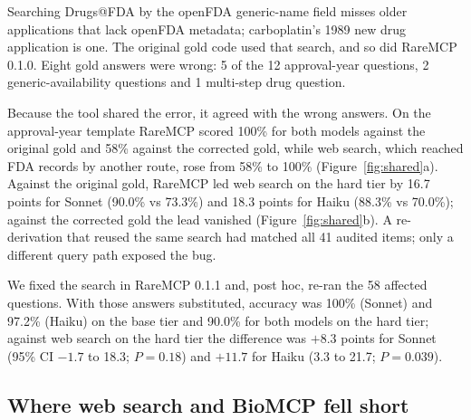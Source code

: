 \documentclass[11pt]{article}
\begin{document}
Searching Drugs@FDA by the openFDA generic-name field misses older applications that lack openFDA metadata; carboplatin's 1989 new drug application is one. The original gold code used that search, and so did RareMCP 0.1.0. Eight gold answers were wrong: 5 of the 12 approval-year questions, 2 generic-availability questions and 1 multi-step drug question.

Because the tool shared the error, it agreed with the wrong answers. On the approval-year template RareMCP scored 100\% for both models against the original gold and 58\% against the corrected gold, while web search, which reached FDA records by another route, rose from 58\% to 100\% (Figure~\ref{fig:shared}a). Against the original gold, RareMCP led web search on the hard tier by 16.7 points for Sonnet (90.0\% vs 73.3\%) and 18.3 points for Haiku (88.3\% vs 70.0\%); against the corrected gold the lead vanished (Figure~\ref{fig:shared}b). A re-derivation that reused the same search had matched all 41 audited items; only a different query path exposed the bug.

We fixed the search in RareMCP 0.1.1 and, post hoc, re-ran the 58 affected questions. With those answers substituted, accuracy was 100\% (Sonnet) and 97.2\% (Haiku) on the base tier and 90.0\% for both models on the hard tier; against web search on the hard tier the difference was $+8.3$ points for Sonnet (95\% CI $-1.7$ to 18.3; $P=0.18$) and $+11.7$ for Haiku (3.3 to 21.7; $P=0.039$).

\subsection{Where web search and BioMCP fell short}

\begin{table}[t]
\centering\footnotesize
\setlength{\tabcolsep}{3pt}
\caption{Accuracy (\%) for Sonnet/Haiku on the templates where conditions differed most (gold v1.1; RareMCP 0.1.0). H: hard tier. On single-trial facts printed on one ClinicalTrials.gov page, web search and RareMCP both scored 100\%.}
\label{tab:templates}
\end{table}
\end{document}

